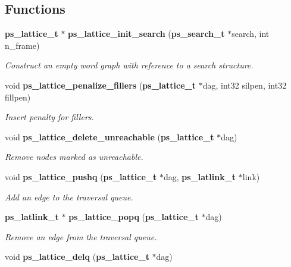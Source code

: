\subsection*{Functions}
\begin{DoxyCompactItemize}
\item 
{\bf ps\+\_\+lattice\+\_\+t} $\ast$ {\bf ps\+\_\+lattice\+\_\+init\+\_\+search} ({\bf ps\+\_\+search\+\_\+t} $\ast$search, int n\+\_\+frame)\label{ps__lattice__internal_8h_a606f6ee0fd569dd5829d7f84ae7e61bd}

\begin{DoxyCompactList}\small\item\em Construct an empty word graph with reference to a search structure. \end{DoxyCompactList}\item 
void {\bf ps\+\_\+lattice\+\_\+penalize\+\_\+fillers} ({\bf ps\+\_\+lattice\+\_\+t} $\ast$dag, int32 silpen, int32 fillpen)\label{ps__lattice__internal_8h_a551b8246b45e8953491a24db438c59c1}

\begin{DoxyCompactList}\small\item\em Insert penalty for fillers. \end{DoxyCompactList}\item 
void {\bf ps\+\_\+lattice\+\_\+delete\+\_\+unreachable} ({\bf ps\+\_\+lattice\+\_\+t} $\ast$dag)\label{ps__lattice__internal_8h_a6da4e36322aaab4d2ebe812bee9a4439}

\begin{DoxyCompactList}\small\item\em Remove nodes marked as unreachable. \end{DoxyCompactList}\item 
void {\bf ps\+\_\+lattice\+\_\+pushq} ({\bf ps\+\_\+lattice\+\_\+t} $\ast$dag, {\bf ps\+\_\+latlink\+\_\+t} $\ast$link)\label{ps__lattice__internal_8h_a04896ebe0e2592bc7950d413b5d5c52e}

\begin{DoxyCompactList}\small\item\em Add an edge to the traversal queue. \end{DoxyCompactList}\item 
{\bf ps\+\_\+latlink\+\_\+t} $\ast$ {\bf ps\+\_\+lattice\+\_\+popq} ({\bf ps\+\_\+lattice\+\_\+t} $\ast$dag)\label{ps__lattice__internal_8h_a481c4d941368597e11b0af4709bd03b0}

\begin{DoxyCompactList}\small\item\em Remove an edge from the traversal queue. \end{DoxyCompactList}\item 
void {\bf ps\+\_\+lattice\+\_\+delq} ({\bf ps\+\_\+lattice\+\_\+t} $\ast$dag)\label{ps__lattice__internal_8h_ad128ca75e8bc7ca4ba41094fb5b68ee9}


\end{DoxyCompactItemize}
